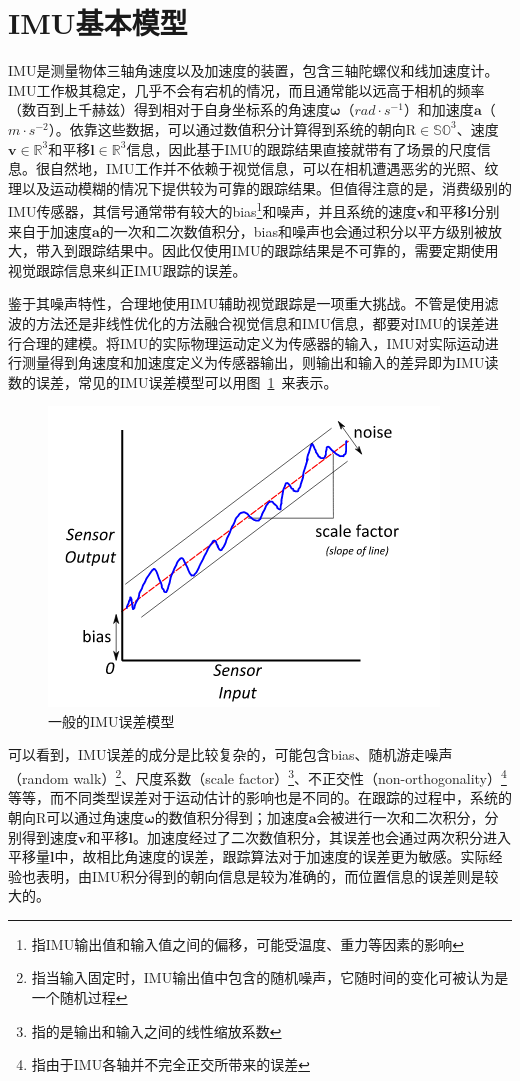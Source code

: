 \section{IMU基本模型}

IMU是测量物体三轴角速度以及加速度的装置，包含三轴陀螺仪和线加速度计。IMU工作极其稳定，几乎不会有宕机的情况，而且通常能以远高于相机的频率（数百到上千赫兹）得到相对于自身坐标系的角速度$\bm{\omega}$（$rad \cdot s^{-1}$）和加速度$\bm{a}$（$m \cdot s^{-2}$）。依靠这些数据，可以通过数值积分计算得到系统的朝向$\mathrm{R}\in\mathbb{SO}^3$、速度$\bm{v}\in\mathbb{R}^3$和平移$\bm{l}\in\mathbb{R}^3$信息，因此基于IMU的跟踪结果直接就带有了场景的尺度信息。很自然地，IMU工作并不依赖于视觉信息，可以在相机遭遇恶劣的光照、纹理以及运动模糊的情况下提供较为可靠的跟踪结果。但值得注意的是，消费级别的IMU传感器，其信号通常带有较大的bias\footnote{指IMU输出值和输入值之间的偏移，可能受温度、重力等因素的影响}和噪声，并且系统的速度$\bm{v}$和平移$\bm{l}$分别来自于加速度$\bm{a}$的一次和二次数值积分，bias和噪声也会通过积分以平方级别被放大，带入到跟踪结果中。因此仅使用IMU的跟踪结果是不可靠的，需要定期使用视觉跟踪信息来纠正IMU跟踪的误差。

鉴于其噪声特性，合理地使用IMU辅助视觉跟踪是一项重大挑战。不管是使用滤波的方法还是非线性优化的方法融合视觉信息和IMU信息，都要对IMU的误差进行合理的建模。将IMU的实际物理运动定义为传感器的输入，IMU对实际运动进行测量得到角速度和加速度定义为传感器输出，则输出和输入的差异即为IMU读数的误差，常见的IMU误差模型可以用图~\ref{fig:common_imu_errors}~来表示。

\begin{figure}[htb!]
    \centering
    \includegraphics[width=.4\textwidth]{Pictures/common_imu_errors.png}
    \caption{一般的IMU误差模型\citep{imu2014}}
    \label{fig:common_imu_errors}
\end{figure}

可以看到，IMU误差的成分是比较复杂的，可能包含bias、随机游走噪声（random walk）\footnote{指当输入固定时，IMU输出值中包含的随机噪声，它随时间的变化可被认为是一个随机过程}、尺度系数（scale factor）\footnote{指的是输出和输入之间的线性缩放系数}、不正交性（non-orthogonality）\footnote{指由于IMU各轴并不完全正交所带来的误差}等等\citep{imu2014}，而不同类型误差对于运动估计的影响也是不同的。在跟踪的过程中，系统的朝向$\mathrm{R}$可以通过角速度$\bm{\omega}$的数值积分得到；加速度$\bm{a}$会被进行一次和二次积分，分别得到速度$\bm{v}$和平移$\bm{l}$。加速度经过了二次数值积分，其误差也会通过两次积分进入平移量$\bm{l}$中，故相比角速度的误差，跟踪算法对于加速度的误差更为敏感。实际经验也表明，由IMU积分得到的朝向信息是较为准确的，而位置信息的误差则是较大的。

